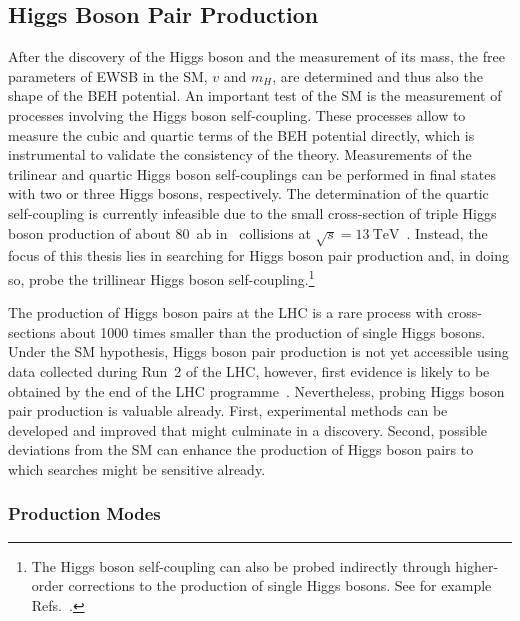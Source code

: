 \subsection{Higgs Boson Pair Production}%
\label{fig:theory_higgs_pair_prod}


After the discovery of the Higgs boson and the measurement of its mass, the free
parameters of EWSB in the SM, $v$ and $m_H$, are determined and thus also the
shape of the BEH potential. An important test of the SM is the measurement of
processes involving the Higgs boson self-coupling. These processes allow to
measure the cubic and quartic terms of the BEH potential directly, which is
instrumental to validate the consistency of the theory. Measurements of the
trilinear and quartic Higgs boson self-couplings can be performed in final
states with two or three Higgs bosons, respectively. The determination of the
quartic self-coupling is currently infeasible due to the small cross-section of
triple Higgs boson production of about \SI{80}{\atto\barn} in \pp~collisions at
$\sqrt{s} = \SI{13}{\TeV}$~\cite{Maltoni:2014eza}. Instead, the focus of this
thesis lies in searching for Higgs boson pair production and, in doing so, probe
the trillinear Higgs boson self-coupling.\footnote{The Higgs boson self-coupling
  can also be probed indirectly through higher-order corrections to the
  production of single Higgs bosons. See for example
  Refs.~\cite{Degrassi:2016wml,ATLAS-CONF-2022-050}.}


The production of Higgs boson pairs at the LHC is a rare process with
cross-sections about 1000 times smaller than the production of single Higgs
bosons. Under the SM hypothesis, Higgs boson pair production is not yet
accessible using data collected during Run~2 of the LHC, however, first evidence
is likely to be obtained by the end of the LHC
programme~\cite{ATL-PHYS-PUB-2022-005}. Nevertheless, probing Higgs boson pair
production is valuable already. First, experimental methods can be developed and
improved that might culminate in a discovery. Second, possible deviations from
the SM can enhance the production of Higgs boson pairs to which searches might
be sensitive already.


\subsubsection{Production Modes}%

